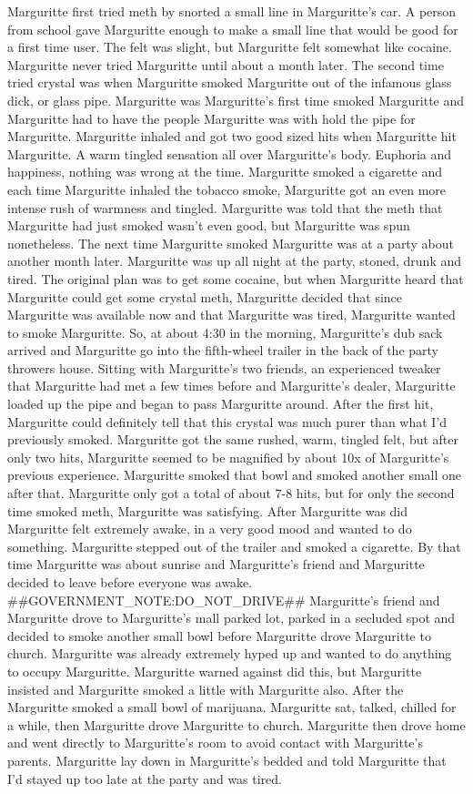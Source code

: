 \documentclass[12pt]{book}
\begin{document}
Marguritte first tried meth by snorted a small line in Marguritte's car. A person from school gave Marguritte enough to make a small line that would be good for a first time user. The felt was slight, but Marguritte felt somewhat like cocaine. Marguritte never tried Marguritte until about a month later. The second time tried crystal was when Marguritte smoked Marguritte out of the infamous glass dick, or glass pipe. Marguritte was Marguritte's first time smoked Marguritte and Marguritte had to have the people Marguritte was with hold the pipe for Marguritte. Marguritte inhaled and got two good sized hits when Marguritte hit Marguritte. A warm tingled sensation all over Marguritte's body. Euphoria and happiness, nothing was wrong at the time. Marguritte smoked a cigarette and each time Marguritte inhaled the tobacco smoke, Marguritte got an even more intense rush of warmness and tingled. Marguritte was told that the meth that Marguritte had just smoked wasn't even good, but Marguritte was spun nonetheless. The next time Marguritte smoked Marguritte was at a party about another month later. Marguritte was up all night at the party, stoned, drunk and tired. The original plan was to get some cocaine, but when Marguritte heard that Marguritte could get some crystal meth, Marguritte decided that since Marguritte was available now and that Marguritte was tired, Marguritte wanted to smoke Marguritte. So, at about 4:30 in the morning, Marguritte's dub sack arrived and Marguritte go into the fifth-wheel trailer in the back of the party throwers house. Sitting with Marguritte's two friends, an experienced tweaker that Marguritte had met a few times before and Marguritte's dealer, Marguritte loaded up the pipe and began to pass Marguritte around. After the first hit, Marguritte could definitely tell that this crystal was much purer than what I'd previously smoked. Marguritte got the same rushed, warm, tingled felt, but after only two hits, Marguritte seemed to be magnified by about 10x of Marguritte's previous experience. Marguritte smoked that bowl and smoked another small one after that. Marguritte only got a total of about 7-8 hits, but for only the second time smoked meth, Marguritte was satisfying. After Marguritte was did Marguritte felt extremely awake, in a very good mood and wanted to do something. Marguritte stepped out of the trailer and smoked a cigarette. By that time Marguritte was about sunrise and Marguritte's friend and Marguritte decided to leave before everyone was awake. \#\#GOVERNMENT\_NOTE:DO\_NOT\_DRIVE\#\# Marguritte's friend and Marguritte drove to Marguritte's mall parked lot, parked in a secluded spot and decided to smoke another small bowl before Marguritte drove Marguritte to church. Marguritte was already extremely hyped up and wanted to do anything to occupy Marguritte. Marguritte warned against did this, but Marguritte insisted and Marguritte smoked a little with Marguritte also. After the Marguritte smoked a small bowl of marijuana. Marguritte sat, talked, chilled for a while, then Marguritte drove Marguritte to church. Marguritte then drove home and went directly to Marguritte's room to avoid contact with Marguritte's parents. Marguritte lay down in Marguritte's bedded and told Marguritte that I'd stayed up too late at the party and was tired. 
\end{document}
